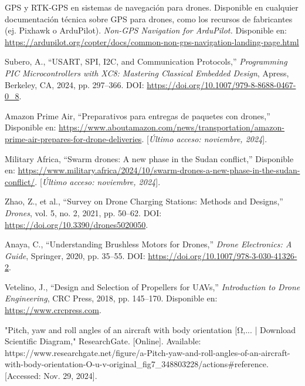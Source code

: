 \begin{thebibliography}{30}
    GPS y RTK-GPS en sistemas de navegación para drones. Disponible en cualquier documentación técnica sobre GPS para drones, como los recursos de fabricantes (ej. Pixhawk o ArduPilot).
        \textit{Non-GPS Navigation for ArduPilot.} Disponible en: \url{https://ardupilot.org/copter/docs/common-non-gps-navigation-landing-page.html}








   
   
    
  
   
   
    Subero, A., ``USART, SPI, I2C, and Communication Protocols,'' \textit{Programming PIC Microcontrollers with XC8: Mastering Classical Embedded Design}, Apress, Berkeley, CA, 2024, pp. 297--366. DOI: \url{https://doi.org/10.1007/979-8-8688-0467-0_8}.

    
   
    Amazon Prime Air, ``Preparativos para entregas de paquetes con drones,'' Disponible en: \url{https://www.aboutamazon.com/news/transportation/amazon-prime-air-prepares-for-drone-deliveries}. [\textit{Último acceso: noviembre, 2024}].
    
    
    Military Africa, ``Swarm drones: A new phase in the Sudan conflict,'' Disponible en: \url{https://www.military.africa/2024/10/swarm-drones-a-new-phase-in-the-sudan-conflict/}. [\textit{Último acceso: noviembre, 2024}].

   
  
  
    Zhao, Z., et al., ``Survey on Drone Charging Stations: Methods and Designs,'' \textit{Drones}, vol. 5, no. 2, 2021, pp. 50--62. DOI: \url{https://doi.org/10.3390/drones5020050}.

    Anaya, C., ``Understanding Brushless Motors for Drones,'' \textit{Drone Electronics: A Guide}, Springer, 2020, pp. 35--55. DOI: \url{https://doi.org/10.1007/978-3-030-41326-2}.

    Vetelino, J., ``Design and Selection of Propellers for UAVs,'' \textit{Introduction to Drone Engineering}, CRC Press, 2018, pp. 145--170. Disponible en: \url{https://www.crcpress.com}.

   

    "Pitch, yaw and roll angles of an aircraft with body orientation [Ω,... | Download Scientific Diagram," ResearchGate. [Online]. Available: https://www.researchgate.net/figure/a-Pitch-yaw-and-roll-angles-of-an-aircraft-with-body-orientation-O-u-v-original_fig7_348803228/actions#reference. [Accessed: Nov. 29, 2024].



\end{thebibliography}
